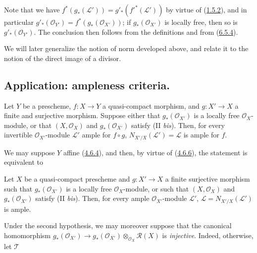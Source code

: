 Note that we have $f^*(g_*(\mathcal{L}'))=g'_*({f'}^*(\mathcal{L}'))$ by
virtue of (\hyperref[II.1.5.2]{1.5.2}), and in particular
$g'_*(\mathcal{O}_{Y'})=f^*(g_*(\mathcal{O}_{X'}))$; if
$g_*(\mathcal{O}_{X'})$ is locally free, then so is
$g'_*(\mathcal{O}_{Y'})$. The conclusion then follows from the definitions
and from (\hyperref[II.6.5.4]{6.5.4}).

\begin{remark}[6.5.9]
\label{II.6.5.9}
We will later generalize the notion of norm developed above, and relate it
to the notion of the direct image of a divisor.
\end{remark}

\subsection{Application: ampleness criteria.}
\label{subsection:II.6.6}

\begin{proposition}[6.6.1]
\label{II.6.6.1}
Let $Y$ be a prescheme, $f:X\to Y$ a quasi-compact morphism, and
$g:X'\to X$ a finite and surjective morphism. Suppose either that
$g_*(\mathcal{O}_{X'})$ is a locally free $\mathcal{O}_X$-module, or
that $(X,\mathcal{O}_X)$ and $g_*(\mathcal{O}_{X'})$ satisfy (II
\emph{bis}). Then, for every invertible $\mathcal{O}_{X'}$-module
$\mathcal{L}'$ ample for $f\circ g$, $N_{X'/X}(\mathcal{L}')=\mathcal{L}$
is ample for $f$.
\end{proposition}

We may suppose $Y$ affine (\hyperref[II.4.6.4]{4.6.4}), and then, by
virtue of (\hyperref[II.4.6.6]{4.6.6}), the statement is equivalent to

\begin{corollary}[6.6.2]
\label{II.6.6.2}
Let $X$ be a quasi-compact prescheme and $g:X'\to X$ a finite surjective
morphism such that $g_*(\mathcal{O}_{X'})$ is a locally free
$\mathcal{O}_X$-module, or such that $(X,\mathcal{O}_X)$ and
$g_*(\mathcal{O}_{X'})$ satisfy (II \emph{bis}). Then, for every ample
$\mathcal{O}_{X'}$-module $\mathcal{L}'$,
$\mathcal{L}=N_{X'/X}(\mathcal{L}')$ is ample.
\end{corollary}

Under the second hypothesis, we may moreover suppose that the canonical
homomorphism
$g_*(\mathcal{O}_{X'})\to
g_*(\mathcal{O}_{X'})\otimes_{\mathcal{O}_X}\mathcal{R}(X)$ is
\emph{injective}. Indeed, otherwise, let $\mathcal{T}$


